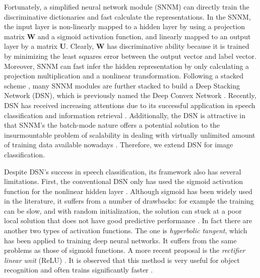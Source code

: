 \documentclass[letterpaper]{article}
\begin{document}
Fortunately, a simplified neural network module (SNNM) \cite{Deng2011a} can directly train the discriminative dictionaries and fast calculate the representations. In the SNNM, the input layer is non-linearly mapped to a hidden layer by using a projection matrix $\textbf{W}$ and a sigmoid activation function, and linearly mapped to an output layer by a matrix $\textbf{U}$. Clearly, $\textbf{W}$ has discriminative ability because it is trained by minimizing the least squares error between the output vector and label vector. Moreover, SNNM can fast infer the hidden representation by only calculating a projection multiplication and a nonlinear transformation. Following a stacked scheme \cite{Wolpert1992}, many SNNM modules are further stacked to build a Deep Stacking Network (DSN), which is previously named the Deep Convex Network \cite{Deng2011b}. Recently, DSN has received increasing attentions due to its successful application in speech classification and information retrieval \cite{Deng2012,Deng2013a}. Additionally, the DSN is attractive in that SNNM's the batch-mode nature offers a potential solution to the insurmountable problem of scalability in dealing with virtually unlimited amount of training data available nowadays \cite{Deng2013book}. Therefore, we extend DSN for image classification.

Despite DSN's success in speech classification, its framework also has several limitations. First, the conventional DSN only has used the sigmoid activation function for the nonlinear hidden layer \cite{Deng2012}. Although sigmoid has been widely used in the literature, it suffers from a number of drawbacks: for example the training can be slow, and with random initialization, the solution can stuck at a poor local solution that does not have good predictive performance \cite{Glorot2010}. In fact there are another two types of activation functions. The one is {\em hyperbolic tangent}, which has been applied to training deep neural networks. It suffers from the same problems as those of sigmoid functions. A more recent proposal is the {\em rectifier linear unit} (ReLU) \cite{Nair2010}. It is observed that this method is very useful for object recognition and often trains significantly faster \cite{Glorot2011}.
\end{document}
